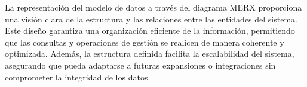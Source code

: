 La representación del modelo de datos a través del diagrama MERX proporciona una visión clara de la estructura y las relaciones entre las entidades del sistema. Este diseño garantiza una organización eficiente 
de la información, permitiendo que las consultas y operaciones de gestión se realicen de manera coherente y optimizada. Además, la estructura definida facilita la escalabilidad del sistema, asegurando que pueda 
adaptarse a futuras expansiones o integraciones sin comprometer la integridad de los datos.
